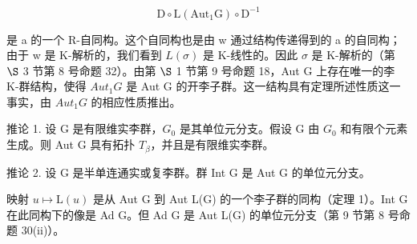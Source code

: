 \[
\mathrm{D} \circ \mathrm{L} (\mathrm{Aut} _ {1} \mathrm{G}) \circ \mathrm{D} ^ {- 1}
\]

是 a 的一个 R-自同构。这个自同构也是由 w 通过结构传递得到的 a 的自同构；由于 w 是 K-解析的，我们看到 \(L(\sigma)\) 是 K-线性的。因此 \(\sigma\) 是 K-解析的（第 \(\S\) 3 节第 8 号命题 32）。由第 \(\S\) 1 节第 9 号命题 18，Aut G 上存在唯一的李 K-群结构，使得 \(Aut_1G\) 是 Aut G 的开李子群。这一结构具有定理所述性质这一事实，由 \(Aut_1G\) 的相应性质推出。

推论 1. 设 G 是有限维实李群，\(G_{0}\) 是其单位元分支。假设 G 由 \(G_{0}\) 和有限个元素生成。则 Aut G 具有拓扑 \(T_{\beta}\)，并且是有限维实李群。

推论 2. 设 G 是半单连通实或复李群。群 Int G 是 Aut G 的单位元分支。

映射 \(u \mapsto \mathrm{L}(u)\) 是从 Aut G 到 Aut L(G) 的一个李子群的同构（定理 1）。Int G 在此同构下的像是 Ad G。但 Ad G 是 Aut L(G) 的单位元分支（第 9 节第 8 号命题 30(ii)）。

